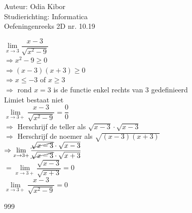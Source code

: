 \documentclass[a4paper]{article}
\begin{document}
  
\noindent \large Auteur: Odia Kibor \\
\noindent \large Studierichting: Informatica\\
\noindent \large Oefeningenreeks 2D nr. 10.19\\

\medskip

\normalsize

$\lim\limits_{x \rightarrow 3} \dfrac{x-3}{\sqrt{x^2 - 9}}$\\

$\Rightarrow x^2 - 9 \geq 0$\\

$\Rightarrow (x-3)(x+3)\geq 0$\\

$\Rightarrow x\leq -3$ of $ x\geq 3$\\

$\Rightarrow$ rond  $ x=3 $ is de functie enkel rechts van $3$ gedefinieerd\\

Limiet bestaat niet \\

$\lim\limits_{x \rightarrow 3+} \dfrac{x-3}{\sqrt{x^2 - 9}} = \dfrac{0}{0}$\\

$\Rightarrow$ Herschrijf de teller als $\sqrt{x-3} \cdot \sqrt{x-3}$\\

$\Rightarrow$ Herschrijf de noemer als $\sqrt{(x-3)(x+3)}$\\

$\Rightarrow \lim\limits_{x \rightarrow 3+}\dfrac{\cancel{\sqrt{x-3}} \cdot \sqrt{x-3}}{\cancel{\sqrt{x-3}} \cdot \sqrt{x+3}}$\\

$= \lim\limits_{x \rightarrow 3+}\dfrac{\sqrt{x-3}}{\sqrt{x+3}} = 0$\\

$\lim\limits_{x \rightarrow 3+} \dfrac{x-3}{\sqrt{x^2 - 9}} = 0$













\begin{thebibliography}{999}
\end{thebibliography}
\end{document}
